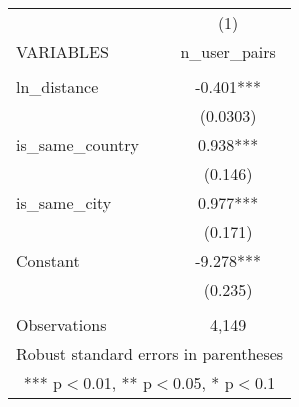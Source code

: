 \begin{tabular}{lc} \hline
 & (1) \\
VARIABLES & n\_user\_pairs \\ \hline
 &  \\
ln\_distance & -0.401*** \\
 & (0.0303) \\
is\_same\_country & 0.938*** \\
 & (0.146) \\
is\_same\_city & 0.977*** \\
 & (0.171) \\
Constant & -9.278*** \\
 & (0.235) \\
 &  \\
 Observations & 4,149 \\ \hline
\multicolumn{2}{c}{ Robust standard errors in parentheses} \\
\multicolumn{2}{c}{ *** p$<$0.01, ** p$<$0.05, * p$<$0.1} \\
\end{tabular}
